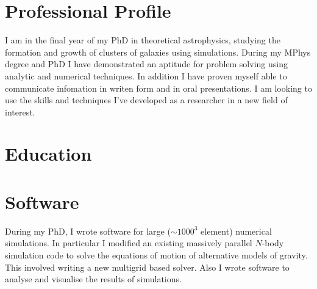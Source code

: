 \documentclass[11pt,a4paper,roman]{moderncv}        %
\begin{document}
\makecvtitle

\section{Professional Profile}
I am in the final year of my PhD in theoretical astrophysics, studying the formation and growth of clusters of galaxies using simulations. 
During my MPhys degree and PhD I have demonstrated an aptitude for problem solving using analytic and numerical techniques. 
In addition I have proven myself able to communicate infomation in writen form and in oral presentations.
I am looking to use the skills and techniques I've developed as a researcher in a new field of interest.

\section{Education}
\section{Software}
During my PhD, I wrote software for large ($\sim1000^3$ element) numerical simulations.
In particular I modified an existing massively parallel $N$-body simulation code to solve the equations of motion of alternative models of gravity.
This involved writing a new multigrid based solver.
Also I wrote software to analyse and visualise the results of simulations.
\newline
\newline
{}
\end{document}
